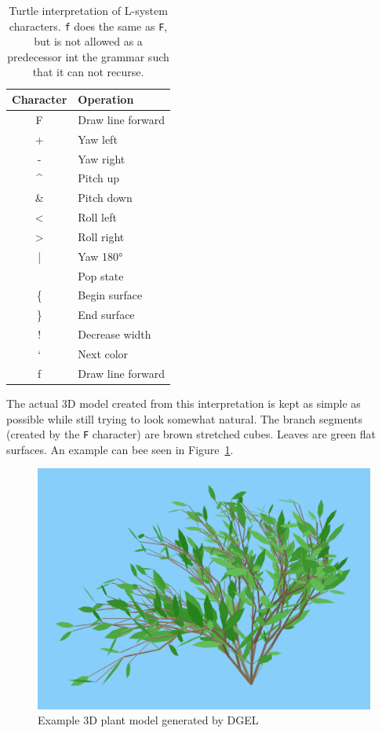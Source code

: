 \begin{table}
    \centering
    \begin{tabular}{| c | l |}
    \hline
    \textbf{Character} & \textbf{Operation} \\ \hline
    F & Draw line forward \\ \hline
    + & Yaw left \\ \hline
    - & Yaw right \\ \hline
    \textasciicircum & Pitch up \\ \hline
    \& & Pitch down \\ \hline
    < & Roll left \\ \hline
    > & Roll right \\ \hline
    | & Yaw 180° \\ \hline
    [ & Push state \\ \hline
    ] & Pop state \\ \hline
    \{ & Begin surface \\ \hline
    \} & End surface \\ \hline
    ! & Decrease width \\ \hline
    ` & Next color \\ \hline
    f & Draw line forward \\
    \hline
    \end{tabular}
    \caption[Turtle interpretation of L-system characters]{Turtle interpretation of L-system characters. \texttt{f} does the same as \texttt{F}, but is not allowed as a predecessor int the grammar such that it can not recurse.}
    \label{tab:turtle-cmd}
\end{table}

The actual 3D model created from this interpretation is kept as simple as possible while still trying to look somewhat natural.
The branch segments (created by the \texttt{F} character) are brown stretched cubes.
Leaves are green flat surfaces.
An example can bee seen in Figure~\ref{fig:example-model}.

\begin{figure}
    \centering
    \includegraphics[width=1.0\textwidth]{figures/example-plant}
    \caption{Example 3D plant model generated by DGEL}
    \label{fig:example-model}
\end{figure}

